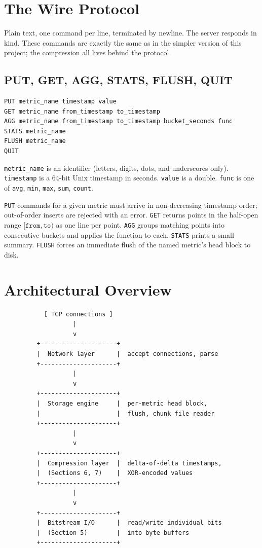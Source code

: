 \documentclass[11pt,a4paper]{article}
\begin{document}
\section{The Wire Protocol}

Plain text, one command per line, terminated by newline. The server responds in kind. These commands are exactly the same as in the simpler version of this project; the compression all lives behind the protocol.

\subsection{PUT, GET, AGG, STATS, FLUSH, QUIT}
\begin{codebox}
\begin{lstlisting}
PUT metric_name timestamp value
GET metric_name from_timestamp to_timestamp
AGG metric_name from_timestamp to_timestamp bucket_seconds func
STATS metric_name
FLUSH metric_name
QUIT
\end{lstlisting}
\end{codebox}

\texttt{metric\_name} is an identifier (letters, digits, dots, and underscores only). \texttt{timestamp} is a 64-bit Unix timestamp in seconds. \texttt{value} is a double. \texttt{func} is one of \texttt{avg}, \texttt{min}, \texttt{max}, \texttt{sum}, \texttt{count}.

\texttt{PUT} commands for a given metric must arrive in non-decreasing timestamp order; out-of-order inserts are rejected with an error. \texttt{GET} returns points in the half-open range $[\texttt{from}, \texttt{to})$ as one line per point. \texttt{AGG} groups matching points into consecutive buckets and applies the function to each. \texttt{STATS} prints a small summary. \texttt{FLUSH} forces an immediate flush of the named metric's head block to disk.

\section{Architectural Overview}

\begin{codebox}
\begin{lstlisting}
           [ TCP connections ]
                   |
                   v
         +---------------------+
         |  Network layer      |  accept connections, parse
         +---------------------+
                   |
                   v
         +---------------------+
         |  Storage engine     |  per-metric head block,
         |                     |  flush, chunk file reader
         +---------------------+
                   |
                   v
         +---------------------+
         |  Compression layer  |  delta-of-delta timestamps,
         |  (Sections 6, 7)    |  XOR-encoded values
         +---------------------+
                   |
                   v
         +---------------------+
         |  Bitstream I/O      |  read/write individual bits
         |  (Section 5)        |  into byte buffers
         +---------------------+
\end{lstlisting}
\end{codebox}
\end{document}
